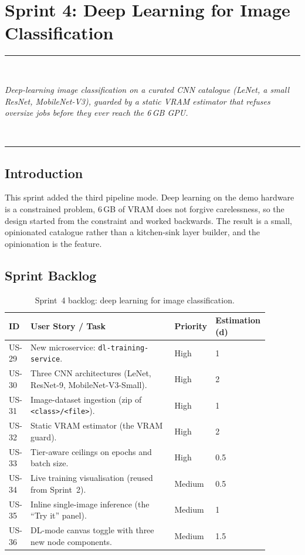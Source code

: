 \documentclass[12pt, a4paper, oneside]{report}
\newcommand{\chapterabstract}[1]{%
  \vspace*{1.2cm}%
  \begin{center}%
  \rule{0.45\textwidth}{0.4pt}\\[0.8em]%
  \begin{minipage}{0.82\textwidth}\centering\itshape\large #1\end{minipage}\\[0.8em]%
  \rule{0.45\textwidth}{0.4pt}%
  \end{center}%
  \vspace*{\fill}\clearpage}
\begin{document}
\chapter{Sprint 4: Deep Learning for Image Classification}
\chapterabstract{Deep-learning image classification on a curated CNN catalogue
(LeNet, a small ResNet, MobileNet-V3), guarded by a static VRAM estimator that
refuses oversize jobs before they ever reach the 6\,GB GPU.}

\section*{Introduction}

This sprint added the third pipeline mode. Deep learning on the demo
hardware is a constrained problem, 6\,GB of VRAM does not forgive
carelessness, so the design started from the constraint and
worked backwards. The result is a small, opinionated catalogue
rather than a kitchen-sink layer builder, and the opinionation is
the feature.

\section{Sprint Backlog}

\begin{table}[H]
\centering
\caption{Sprint~4 backlog: deep learning for image classification.}
\label{tab:sprint4_backlog}
\begin{tabular}{|p{0.05\linewidth}|L{0.55\linewidth}|p{0.1\linewidth}|p{0.18\linewidth}|}
\hline
\textbf{ID} & \textbf{User Story / Task} & \textbf{Priority} & \textbf{Estimation (d)} \\
\hline
US-29 & New microservice: \texttt{dl-training-service}. & High & 1 \\ \hline
US-30 & Three CNN architectures (LeNet, ResNet-9, MobileNet-V3-Small). & High & 2 \\ \hline
US-31 & Image-dataset ingestion (zip of \texttt{<class>/<file>}). & High & 1 \\ \hline
US-32 & Static VRAM estimator (the VRAM guard). & High & 2 \\ \hline
US-33 & Tier-aware ceilings on epochs and batch size. & High & 0.5 \\ \hline
US-34 & Live training visualisation (reused from Sprint~2). & Medium & 0.5 \\ \hline
US-35 & Inline single-image inference (the ``Try it'' panel). & Medium & 1 \\ \hline
US-36 & DL-mode canvas toggle with three new node components. & Medium & 1.5 \\
\hline
\end{tabular}
\end{table}
\end{document}
